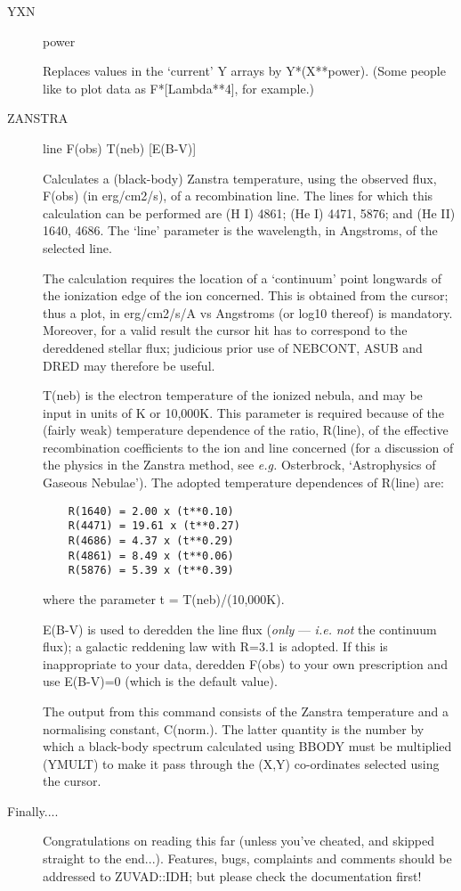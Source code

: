 \begin {description}
\item [YXN] power

Replaces values in the `current' Y arrays by Y*(X**power). (Some
people like to plot data as F*[Lambda**4], for example.)

\item [ZANSTRA] line F(obs) T(neb) [E(B-V)]

Calculates a (black-body) Zanstra temperature, using the observed
flux, F(obs) \newline (in erg/cm2/s), of a recombination line. The
lines for which this calculation can be performed are (H I) 4861; (He
I) 4471, 5876; and (He II) 1640, 4686. The `line' parameter is the
wavelength, in Angstroms, of the selected line.

The calculation requires the location of a `continuum' point longwards
of the ionization edge of the ion concerned. This is obtained from the
cursor; thus a plot, in erg/cm2/s/A vs Angstroms (or log10 thereof) is
mandatory. Moreover, for a valid result the cursor hit has to
correspond to the dereddened stellar flux; judicious prior use of
NEBCONT, ASUB and DRED may therefore be useful.

T(neb) is the electron temperature of the ionized nebula, and may be
input in units of K or 10,000K. This parameter is required because of
the (fairly weak) temperature dependence of the ratio, R(line), of the
effective recombination coefficients to the ion and line concerned
(for a discussion of the physics in the Zanstra method, see {\em e.g.}
Osterbrock, `Astrophysics of Gaseous Nebulae'). The adopted
temperature dependences of R(line) are:

\begin{verbatim}
    R(1640) = 2.00 x (t**0.10)
    R(4471) = 19.61 x (t**0.27)
    R(4686) = 4.37 x (t**0.29)
    R(4861) = 8.49 x (t**0.06)
    R(5876) = 5.39 x (t**0.39)
\end{verbatim}

where the parameter t = T(neb)/(10,000K).

E(B-V) is used to deredden the line flux ({\em only} --- {\em i.e.}
{\em not} the continuum flux); a galactic reddening law with R=3.1 is
adopted. If this is inappropriate to your data, deredden F(obs) to
your own prescription and use E(B-V)=0 (which is the default value).

The output from this command consists of the Zanstra temperature and a
normalising constant, C(norm.). The latter quantity is the number by
which a black-body spectrum calculated using BBODY must be multiplied
(YMULT) to make it pass through the (X,Y) co-ordinates selected using
the cursor.

\item [Finally....] 

Congratulations on reading this far (unless you've cheated, and
skipped straight to the end...). Features, bugs, complaints and
comments should be addressed to ZUVAD::IDH; but please check the
documentation first!

\end{description}


